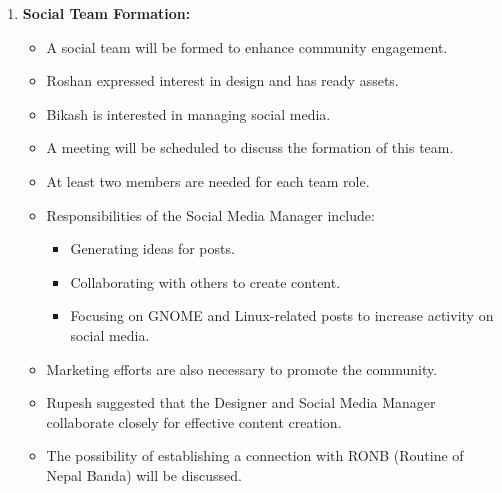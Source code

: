 \documentclass[a4paper,11pt]{article}
\begin{document}
\begin{enumerate}[label=\arabic*.]
    \item \textbf{Social Team Formation:} \\
    \begin{itemize}
        \item A social team will be formed to enhance community engagement.
        \item Roshan expressed interest in design and has ready assets.
        \item Bikash is interested in managing social media.
        \item A meeting will be scheduled to discuss the formation of this team.
        \item At least two members are needed for each team role.
        \item Responsibilities of the Social Media Manager include:
        \begin{itemize}
            \item Generating ideas for posts.
            \item Collaborating with others to create content.
            \item Focusing on GNOME and Linux-related posts to increase activity on social media.
        \end{itemize}
        \item Marketing efforts are also necessary to promote the community.
        \item Rupesh suggested that the Designer and Social Media Manager collaborate closely for effective content creation.
        \item The possibility of establishing a connection with RONB (Routine of Nepal Banda) will be discussed.
    \end{itemize}


\end{enumerate}
\end{document}
